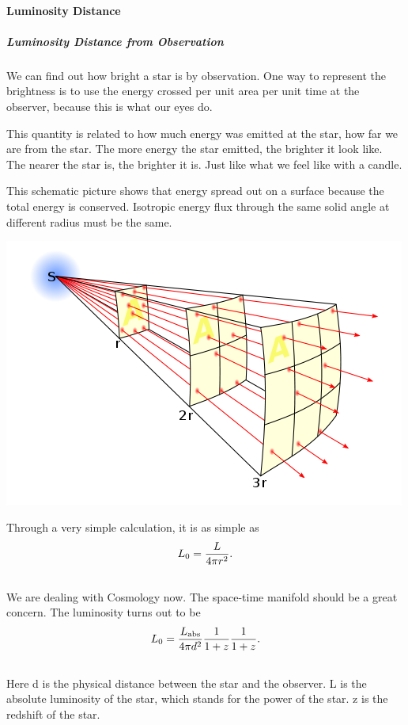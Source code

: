 \documentclass[letterpaper,10pt,english]{sphinxmanual}
\begin{document}
\paragraph{Luminosity Distance}
\label{Cosmology/cosmoIndex:luminosity-distance}

\subparagraph{Luminosity Distance from Observation}
\label{Cosmology/cosmoIndex:luminosity-distance-from-observation}
We can find out how bright a star is by observation. One way to represent the brightness is to use the energy crossed per unit area per unit time at the observer, because this is what our eyes do.

This quantity is related to how much energy was emitted at the star, how far we are from the star. The more energy the star emitted, the brighter it look like. The nearer the star is, the brighter it is. Just like what we feel like with a candle.

This schematic picture shows that energy spread out on a surface because the total energy is conserved. Isotropic energy flux through the same solid angle at different radius must be the same.

{\hfill\includegraphics{InverseSquareLaw.png}\hfill}

Through a very simple calculation, it is as simple as
\begin{gather}
\begin{split}L_0 = \frac{ L }{ 4\pi r^2 } .\end{split}\notag\\\begin{split}\end{split}\notag
\end{gather}
We are dealing with Cosmology now. The space-time manifold should be a great concern. The luminosity turns out to be
\begin{gather}
\begin{split}L_0 = \frac{L_\mathrm{abs} }{4\pi d^2} \frac{1}{1+z} \frac{1}{1+z} .\end{split}\notag\\\begin{split}\end{split}\notag
\end{gather}
Here d is the physical distance between the star and the observer. L is the absolute luminosity of the star, which stands for the power of the star. z is the redshift of the star.
\end{document}
